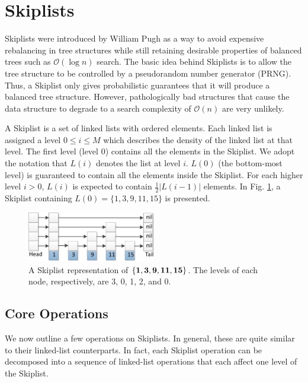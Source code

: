 \documentclass{acm_proc_article-sp}
\begin{document}
\section{Skiplists}
Skiplists were introduced by William Pugh \cite{pugh90} as a way
to avoid expensive rebalancing in tree structures while
still retaining desirable properties of balanced
trees such as $\mathcal{O}(\log n)$ search. The basic
idea behind Skiplists is to allow the tree structure
to be controlled by a pseudorandom number generator (PRNG). Thus,
a Skiplist only gives probabilistic guarantees that it will
produce a balanced tree structure.
However, pathologically bad structures that cause the data structure to degrade
to a search complexity of $\mathcal{O}(n)$ are very unlikely.

A Skiplist is a set of linked lists with ordered elements.
Each linked list is assigned a level $0 \leq i \leq M$ which describes
the density of the linked list at that level. The first
level (level 0) contains all the elements in the Skiplist.  We
adopt the notation that $L(i)$ denotes the list at level
$i$. $L(0)$ (the bottom-most level) is guaranteed to 
contain all the elements inside the Skiplist. For each higher level
$i > 0$, $L(i)$
is expected to contain $\frac{1}{2}|L(i-1)|$ elements.
In Fig. \ref{fig:skiplist}, a Skiplist containing
$L(0) = \{1,3,9,11,15\}$ is presented.

\begin{figure}[H]
  \includegraphics[width=0.5\textwidth]{img/skiplist-crop.pdf}
  \caption{A Skiplist representation of $\bf \{1,3,9,11,15\}$. The levels of
each node, respectively, are 3, 0, 1, 2, and 0.}
  \label{fig:skiplist}
\end{figure}

\subsection{Core Operations}

We now outline a few operations on Skiplists. In general, these are
quite similar to their linked-list counterparts. In fact, each Skiplist
operation can be decomposed into a sequence of linked-list operations that
each affect
one level of the Skiplist.
\end{document}
